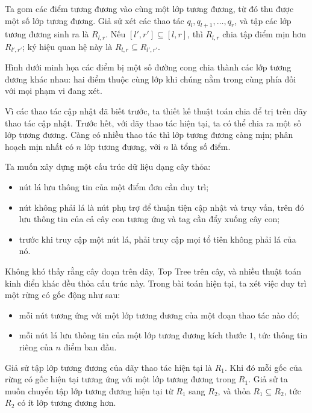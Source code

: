 \documentclass[11pt]{article}
\begin{document}
Ta gom các điểm tương đương vào cùng một lớp tương đương, từ đó thu được một số
lớp tương đương. Giả sử xét các thao tác \(q_l,q_{l+1},\ldots,q_r\), và tập
các lớp tương đương sinh ra là \(R_{l,r}\). Nếu
\([l',r']\subseteq[l,r]\), thì \(R_{l,r}\) chia tập điểm mịn hơn
\(R_{l',r'}\); ký hiệu quan hệ này là \(R_{l,r}\subseteq R_{l',r'}\).

Hình dưới minh họa các điểm bị một số đường cong chia thành các lớp tương đương
khác nhau: hai điểm thuộc cùng lớp khi chúng nằm trong cùng phía đối với mọi
phạm vi đang xét.


Vì các thao tác cập nhật đã biết trước, ta thiết kế thuật toán chia để trị trên
dãy thao tác cập nhật. Trước hết, với dãy thao tác hiện tại, ta có thể chia ra
một số lớp tương đương. Càng có nhiều thao tác thì lớp tương đương càng mịn;
phân hoạch mịn nhất có \(n\) lớp tương đương, với \(n\) là tổng số điểm.

Ta muốn xây dựng một cấu trúc dữ liệu dạng cây thỏa:
\begin{itemize}
  \item nút lá lưu thông tin của một điểm đơn cần duy trì;
  \item nút không phải lá là nút phụ trợ để thuận tiện cập nhật và truy vấn,
  trên đó lưu thông tin của cả cây con tương ứng và tag cần đẩy xuống cây con;
  \item trước khi truy cập một nút lá, phải truy cập mọi tổ tiên không phải lá
  của nó.
\end{itemize}

Không khó thấy rằng cây đoạn trên dãy, Top Tree trên cây, và nhiều thuật toán
kinh điển khác đều thỏa cấu trúc này. Trong bài toán hiện tại, ta xét việc duy
trì một rừng có gốc động như sau:
\begin{itemize}
  \item mỗi nút tương ứng với một lớp tương đương của một đoạn thao tác nào đó;
  \item mỗi nút lá lưu thông tin của một lớp tương đương kích thước \(1\), tức
  thông tin riêng của \(n\) điểm ban đầu.
\end{itemize}

Giả sử tập lớp tương đương của dãy thao tác hiện tại là \(R_1\). Khi đó mỗi gốc
của rừng có gốc hiện tại tương ứng với một lớp tương đương trong \(R_1\). Giả
sử ta muốn chuyển tập lớp tương đương hiện tại từ \(R_1\) sang \(R_2\), và
thỏa \(R_1\subseteq R_2\), tức \(R_2\) có ít lớp tương đương hơn.
\end{document}
